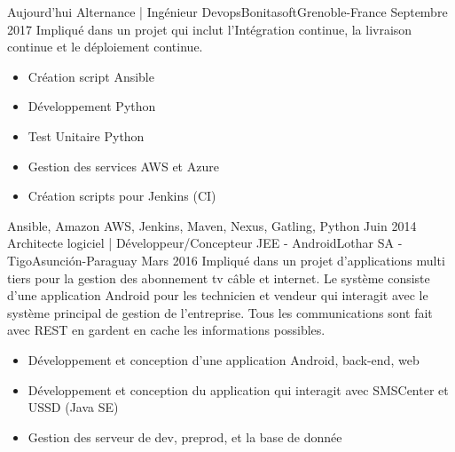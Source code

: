 %
%
%
\begin{experiences}
  \projectexperiences
    {Aujourd'hui}   {Alternance | Ingénieur Devops}{Bonitasoft}{Grenoble-France}
    {Septembre 2017}
                    {Impliqué dans un projet qui inclut l'Intégration continue, la livraison continue et le déploiement continue.}
                    {
                      \begin{itemize}
                        \item Création script Ansible
                        \item Développement Python
                        \item Test Unitaire Python
                        \item Gestion des services AWS et Azure
                        \item Création scripts pour Jenkins (CI)
                      \end{itemize}
                    }
                    {Ansible, Amazon AWS, Jenkins, Maven, Nexus, Gatling, Python}
  \emptySeparator
  \projectexperiences
    {Juin 2014}  {Architecte logiciel | Développeur/Concepteur JEE - Android}{Lothar SA - Tigo}{Asunción-Paraguay}
    {Mars 2016}
                 {Impliqué dans un projet d'applications multi tiers pour la gestion des abonnement tv câble et internet.
                 Le système consiste d'une application Android pour les technicien et vendeur qui interagit avec le système
                 principal de gestion de l'entreprise. Tous les communications sont fait avec REST en gardent en cache les
                 informations possibles.
                }
                 {
                      \begin{itemize}
                        \item Développement et conception d'une application Android, back-end, web
                        \item Développement et conception du application qui interagit avec SMSCenter et USSD (Java SE)
                        \item Gestion des serveur de dev, preprod, et la base de donnée
                      \end{itemize}
}
\end{experiences}
